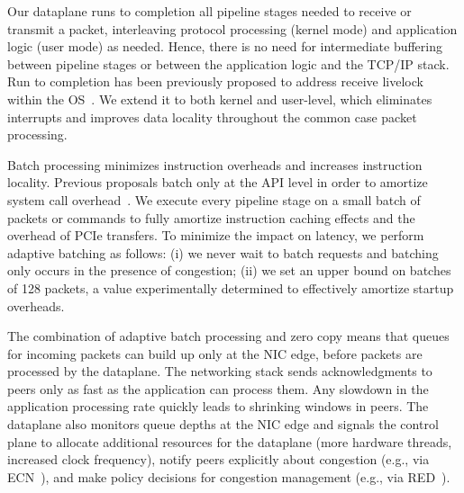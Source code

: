 

 Our dataplane
runs to completion all pipeline stages needed to receive or transmit a
packet, interleaving protocol processing (kernel mode) and application
logic (user mode) as needed. Hence, there is no need for intermediate
buffering between pipeline stages or between the application logic and
the TCP/IP stack. Run to completion has been previously proposed to
address receive livelock within the OS~\cite{receivelivelock}. We
extend it to both kernel and user-level, which eliminates interrupts
and improves data locality throughout the common case packet
processing.

Batch processing minimizes instruction overheads and increases
instruction locality. Previous proposals batch only at the API level
in order to amortize system call
overhead~\cite{jeong2014mtcp,han2012megapipe,soares2010flexsc}. We
execute every pipeline stage on a small batch of packets or commands
to fully amortize instruction caching effects and the overhead of PCIe
transfers. To minimize the impact on latency, we perform adaptive
batching as follows: (i) we never wait to batch requests and batching
only occurs in the presence of congestion; (ii) we set an upper bound
on batches of 128 packets, a value experimentally determined to
effectively amortize startup overheads.


The combination of adaptive batch processing and zero copy means that
queues for incoming packets can build up only at the NIC edge, before
packets are processed by the dataplane.  The networking stack sends
acknowledgments to peers only as fast as the application can process
them. Any slowdown in the application processing rate quickly leads to
shrinking windows in peers. The dataplane also monitors queue depths
at the NIC edge and signals the control plane to allocate additional
resources for the dataplane (more hardware threads, increased clock
frequency), notify peers explicitly about congestion (e.g., via
ECN~\cite{ramakrishnan2001addition}), and make policy decisions for
congestion management (e.g., via
RED~\cite{DBLP:journals/ton/FloydJ93}).


